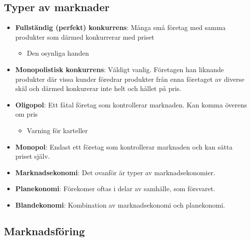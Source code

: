 \subsection{Typer av marknader}
\begin{itemize}
    \item \textbf{Fullständig (perfekt) konkurrens}: \newline
    Många små företag med samma produkter som därmed konkurrerar med priset
    \begin{itemize}
        \item Den osynliga handen
    \end{itemize}
    \item \textbf{Monopolistisk konkurrens}: \newline
    Väldigt vanlig. Företagen han liknande produkter där vissa kunder föredrar 
    produkter från enna företaget av diverse skäl och därmed konkurerar inte helt
    och hållet på pris.
    \item \textbf{Oligopol}: \newline
    Ett fåtal företag som kontrollerar marknaden. Kan komma överens om pris
    \begin{itemize}
        \item Varning för karteller
    \end{itemize}
    \item \textbf{Monopol}: \newline
    Endast ett företag som kontrollerar marknaden och kan sätta priset själv. 
    \item \textbf{Marknadsekonomi}: \newline
    Det ovanför är typer av marknadsekonomier.
    \item \textbf{Planekonomi}: \newline
    Förekomer oftas i delar av samhälle, som försvaret.
    \item \textbf{Blandekonomi}: \newline
    Kombination av marknadsekonomi och planekonomi.
\end{itemize}

\subsection{Marknadsföring}
